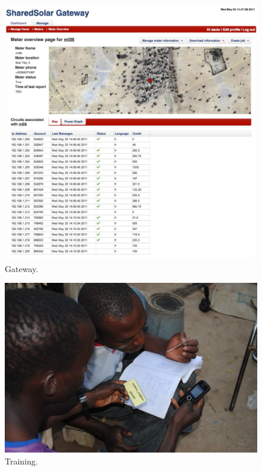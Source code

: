 \documentclass[conference]{IEEEtran}
\begin{document}
\begin{figure}[]
\begin{center}
\includegraphics[width=\columnwidth]{figures/gateway.jpg}
\end{center}
\caption{Gateway.}
\label{gateway}
\end{figure}

\begin{figure}[]
\begin{center}
\includegraphics[width=\columnwidth]{figures/training.jpg}
\end{center}
\caption{Training.}
\label{training}
\end{figure}
\end{document}
